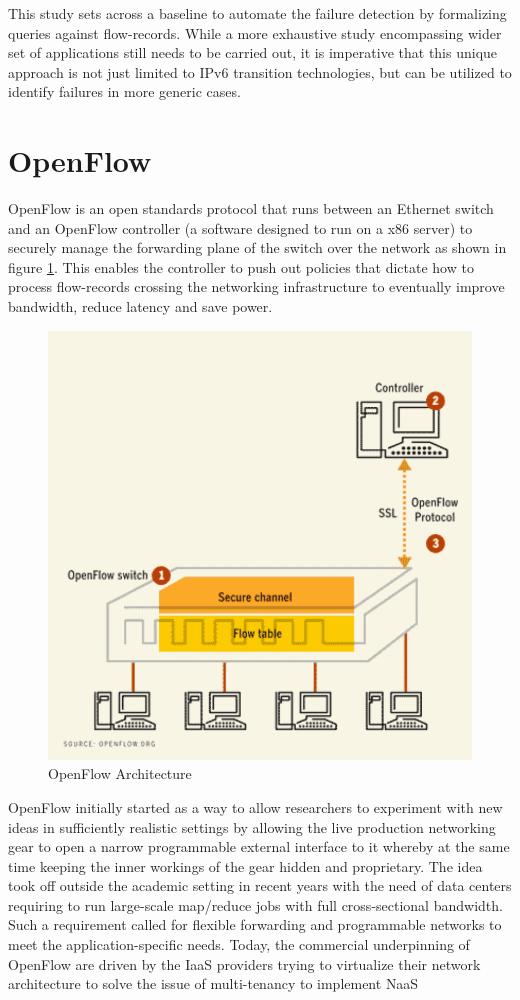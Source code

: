 This study sets across a baseline to automate the failure detection by formalizing queries against flow-records. While a more exhaustive study encompassing wider set of applications still needs to be carried out, it is imperative that this unique approach is not just limited to IPv$6$ transition technologies, but can be utilized to identify failures in more generic cases.

\section{OpenFlow}\label{sec:openflow}
OpenFlow \cite{nmckeown:2008} is an open standards protocol that runs between an Ethernet switch and an OpenFlow controller (a software designed to run on a x$86$ server) to securely manage the forwarding plane of the switch over the network as shown in figure \ref{fig:openflow-architecture}. This enables the controller to push out policies that dictate how to process flow-records crossing the networking infrastructure to eventually improve bandwidth, reduce latency and save power. 
\begin{figure}[h!]
\begin{center}
  \includegraphics* [width=0.5\linewidth]{figures/openflow}	
  \caption{OpenFlow Architecture \cite{newscientist:2009}}
  \label{fig:openflow-architecture}
\end{center}
\end{figure}

OpenFlow initially started as a way to allow researchers to experiment with new ideas in sufficiently realistic settings by allowing the live production networking gear to open a narrow programmable external interface to it whereby at the same time keeping the inner workings of the gear hidden and proprietary.  The idea took off outside the  academic setting in recent years with the need of data centers requiring to run large-scale map/reduce jobs with full cross-sectional bandwidth. Such a requirement called for flexible forwarding and programmable networks to meet the application-specific needs. Today, the commercial underpinning of OpenFlow are driven by the \ac{IaaS} providers trying to virtualize their network architecture to solve the issue of multi-tenancy to implement \ac{NaaS}

